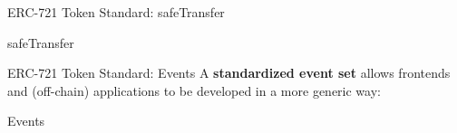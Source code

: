 \documentclass[handout]{beamer}
\begin{document}
\begin{frame}{ERC-721 Token Standard: safeTransfer}
	\begin{samplecode}{safeTransfer}
		
	\end{samplecode}
\end{frame}



\begin{frame}{ERC-721 Token Standard: Events}
\vspace{0.5em}
	A \textbf{standardized event set} allows frontends and (off-chain) applications to be developed in a more generic way:
\vspace{1em}
	\begin{samplecode}{Events}
		
	\end{samplecode}
\end{frame}
\end{document}
